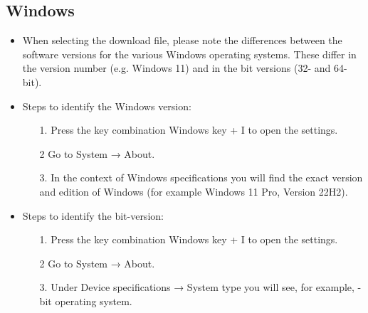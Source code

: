 \subsection*{Windows}
\begin{itemize}
	\item When selecting the download file, please note the differences between the software versions for the various Windows operating systems. These differ in the version number (e.g. \glqq Windows 11\grqq {}) and in the bit versions (32- and 64-bit).
	\item Steps to identify the Windows version:
	\begin{itemize}
			\item[1.] Press the key combination Windows key + I to open the settings.
		\item[2] Go to System → About.
		\item[3.] In the context of Windows specifications you will find the exact version and edition of Windows (for example \glqq Windows 11 Pro\grqq {}, \glqq Version 22H2\grqq {}).
	\end{itemize}
	\item Steps to identify the bit-version:
	\begin{itemize}
		\item[1.] Press the key combination Windows key + I to open the settings.
		\item[2] Go to System → About.
		\item[3.] Under Device specifications → System type you will see, for example, -bit operating system\grqq {}.

\end{itemize}
\end{itemize}
